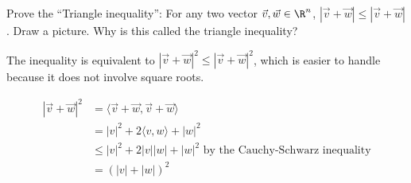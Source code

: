 \documentclass{ximera}
\begin{document}
Prove the ``Triangle inequality'':  For any two vector $\vec{v},\vec{w} \in \R^n$, $|\vec{v}+\vec{w}|\leq |\vec{v}+\vec{w}|$.  Draw a picture.  Why is this called the triangle inequality?


\begin{free-response}
  The inequality is equivalent to $|\vec{v}+\vec{w}|^2\leq |\vec{v}+\vec{w}|^2$, which is easier to handle because it does not involve square roots.
  
  \begin{align*}
    |\vec{v}+\vec{w}|^2  &= \langle \vec{v}+\vec{w},\vec{v}+\vec{w}\rangle\\
    &= |v|^2+2\langle v,w\rangle + |w|^2\\
    &\leq |v|^2+2|v||w|+|w|^2 \text{ by the Cauchy-Schwarz inequality}\\
    &= (|v|+|w|)^2
  \end{align*}
\end{free-response} 	
    
\end{document}
